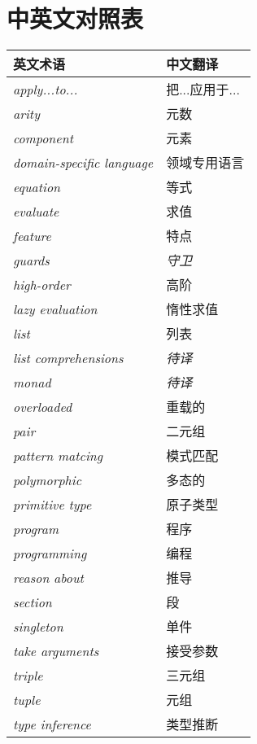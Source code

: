 \chapter*{中英文对照表}

\begin{table}[htbp]
\label{tab:threesome}
\centering
\begin{tabular}{ll}
\hline
英文术语 & 中文翻译 \\
\hline
\textit{apply...to...} & 把...应用于...\\
\textit{arity} & 元数 \\
\textit{component} & 元素 \\
\textit{domain-specific language} & 领域专用语言 \\
\textit{equation} & 等式 \\
\textit{evaluate} & 求值 \\
\textit{feature} & 特点 \\
\textit{guards} & \textit{守卫} \\
\textit{high-order} & 高阶 \\
\textit{lazy evaluation} & 惰性求值 \\
\textit{list} & 列表 \\
\textit{list comprehensions} & \textit{待译}\\
\textit{monad} & \textit{待译} \\
\textit{overloaded} & 重载的 \\
\textit{pair} & 二元组 \\
\textit{pattern matcing} & 模式匹配 \\
\textit{polymorphic} & 多态的 \\
\textit{primitive type} & 原子类型 \\
\textit{program} & 程序 \\
\textit{programming} & 编程 \\
\textit{reason about} & 推导 \\
\textit{section} & 段 \\
\textit{singleton} & 单件 \\
\textit{take arguments} & 接受参数 \\
\textit{triple} & 三元组 \\
\textit{tuple} & 元组 \\
\textit{type inference} & 类型推断 \\

\hline
\end{tabular}
\end{table}


